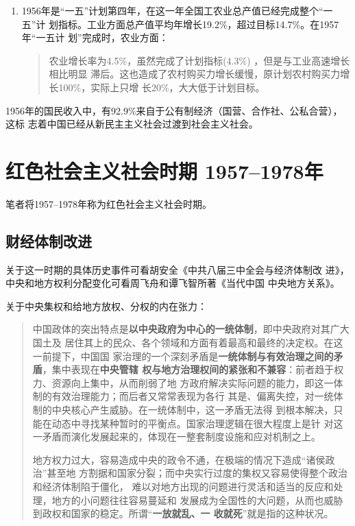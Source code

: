 \begin{enumerate}

\item 1956年是“一五”计划第四年，在这一年全国工农业总产值已经完成整个“一五”计
  划指标。工业方面总产值平均年增长19.2\%，超过目标14.7\%。在1957年“一五计
  划”完成时，农业方面：
  \begin{quotation}
    农业增长率为4.5\%，虽然完成了计划指标(4.3\%) ，但是与工业高速增长相比明显
    滞后。这也造成了农村购买力增长缓慢，原计划农村购买力增长100\%，实际上只增
    长20\%，大大低于计划目标。\cite{shiyiwu}
  \end{quotation}
\end{enumerate}

1956年的国民收入中，有92.9\%来自于公有制经济（国营、合作社、公私合营），这标
志着中国已经从新民主主义社会过渡到社会主义社会。

\section{红色社会主义社会时期 1957--1978年}


笔者将1957--1978年称为红色社会主义社会时期。

\subsection{财经体制改进}

关于这一时期的具体历史事件可看胡安全《中共八届三中全会与经济体制改
进》\cite{DZSY201701010}，中央和地方权利分配变化可看周飞舟和谭飞智所著《当代中国
中央地方关系》\cite{yangdi}。

关于中央集权和给地方放权、分权的内在张力：
\begin{quotation}
  中国政体的突出特点是\textbf{以中央政府为中心的一统体制}，即中央政府对其广大国土及
  居住其上的民众、各个领域和方面有着最高和最终的决定权。在这一前提下，中国国
  家治理的一个深刻矛盾是\textbf{一统体制与有效治理之间的矛盾}，集中表现在\textbf{中央管辖
    权与地方治理权间的紧张和不兼容}：前者趋于权力、资源向上集中，从而削弱了地
  方政府解决实际问题的能力，即这一体制的有效治理能力；而后者又常常表现为各行
  其是、偏离失控，对一统体制的中央核心产生威胁。在一统体制中，这一矛盾无法得
  到根本解决，只能在动态中寻找某种暂时的平衡点。国家治理逻辑在很大程度上是针
  对这一矛盾而演化发展起来的，体现在一整套制度设施和应对机制之上。\cite{zhililuoji}

  地方权力过大，容易造成中央的政令不通，在极端的情况下造成“诸侯政治”甚至地
  方割据和国家分裂；而中央实行过度的集权又容易使得整个政治和经济体制陷于僵化，
  难以对地方出现的问题进行灵活和适当的反应和处理，地方的小问题往往容易蔓延和
  发展成为全国性的大问题，从而也威胁到政权和国家的稳定。所谓“\textbf{一放就乱、一
    收就死}”就是指的这种状况。\cite{yangdi}
\end{quotation}


